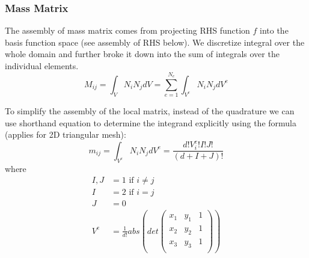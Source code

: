 \documentclass[unicode,11pt,a4paper,oneside,numbers=endperiod,openany]{scrartcl}
\begin{document}
\subsubsection{Mass Matrix}
The assembly of mass matrix comes from projecting RHS function $f$ into the basis function space (see assembly of RHS below). We discretize integral over the whole domain and further broke it down into the sum of integrals over the individual elements.
\begin{equation}
    M_{ij} = \int_V N_i N_j dV = \sum_{e=1}^{N_e} \int_{V^e} N_i N_j dV^e
\end{equation}


To simplify the assembly of the local matrix, instead of the quadrature we can use shorthand equation to determine the integrand explicitly using the formula (applies for 2D triangular mesh):
\begin{equation}
    m_{ij} = \int_{V^e} N_i N_j  dV^e = \frac{d!V_i^e!I!J!}{(d+I+J)!}
\end{equation}
where
\begin{align}
    I,J &= 1 \text{ \ \  \ \ \ if } i\neq j \\
    I &= 2 \text{ \ \  \ \ \ if } i = j \\
    J &= 0 \\
    V^e &= \frac{1}{d!} abs (det (
    \begin{matrix}
    x_1 & y_1 & 1 \\
    x_2 & y_2 & 1 \\
    x_3 & y_3 & 1 \\
    \end{matrix}))
\end{align}
\end{document}
